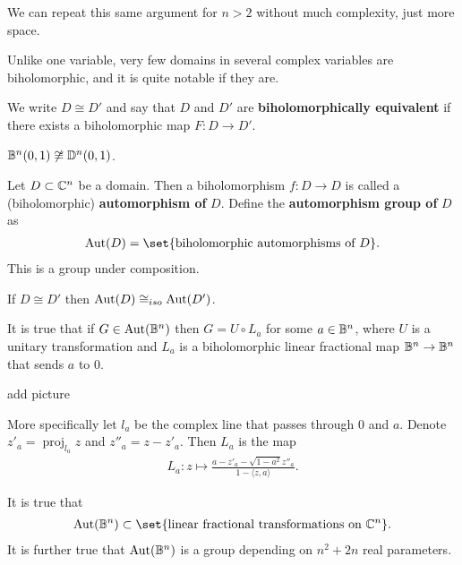 \begin{note}
    We can repeat this same argument for $n>2$ without much complexity, just more space.
\end{note}

\begin{remark}
    Unlike one variable, very few domains in several complex variables are biholomorphic, and it is quite notable if they are.
\end{remark}

\begin{definition}
    We write $D \cong D'$ and say that $D$ and $D'$ are \textbf{biholomorphically equivalent} if there exists a biholomorphic map $F: D \to D'$.
\end{definition}


\begin{nexample}
    $\ball^n(0,1) \not\cong \DD^n(0,1)$.
\end{nexample}

\begin{definition}
    Let $D \subset \mathbb{C}^n$ be a domain. Then a biholomorphism $f: D \to D$ is called a (biholomorphic) \textbf{automorphism of} $D$. Define the \textbf{automorphism group of} $D$ as
    \begin{align*}
        \Aut(D) = \set{\text{biholomorphic automorphisms of } D}.
    \end{align*}
    This is a group under composition.
\end{definition}

\begin{remark}
    If $D \cong D'$ then $\operatorname{Aut} (D) \cong_{iso} \operatorname{Aut}(D')$.
\end{remark}

\begin{remark}
    It is true that if $G \in \Aut(\ball^n)$ then $G = U \circ L_a$ for some $a \in \ball^n$, where $U$ is a unitary transformation and $L_a$ is a biholomorphic linear fractional map $\ball^n \to \ball^n$ that sends $a$ to $0$.

    add picture

    More specifically let $l_a$ be the complex line that passes through $0$ and $a$. Denote $z'_a = \operatorname{proj}_{l_a} z$ and $z''_a = z-z'_a$. Then $L_a$ is the map
    \begin{align*}
        L_a : z \mapsto \frac{a - z'_a - \sqrt{1-a^2} z''_a}{1- \langle z,a \rangle}.
    \end{align*}

    It is true that
    \begin{align*}
        \Aut(\ball^n) \subset \set{ \text{linear fractional transformations on } \C^n }.
    \end{align*}
    It is further true that $\Aut(\ball^n)$ is a group depending on $n^2 + 2n$ real parameters.
\end{remark}

